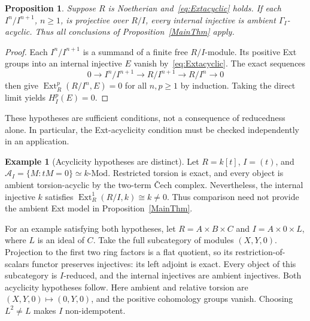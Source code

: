\documentclass[11pt,reqno]{amsart}
\newtheorem{proposition}[theorem]{Proposition}
\theoremstyle{definition}
\newtheorem{example}[theorem]{Example}
\theoremstyle{remark}
\newcommand{\Mod}{\text{-}\mathrm{Mod}}
\newcommand{\Ext}{\operatorname{Ext}}
\newcommand{\A}{\mathcal A_I}
\begin{document}
\begin{proposition}\label{Inj n}
Suppose $R$ is Noetherian and~\eqref{eq:Extacyclic} holds. If each $I^n/I^{n+1}$, $n\geq1$, is projective over $R/I$, every internal injective is ambient $\Gamma_I$-acyclic. Thus all conclusions of Proposition~\ref{MainThm} apply.
\end{proposition}
\begin{proof}
Each $I^n/I^{n+1}$ is a summand of a finite free $R/I$-module. Its positive Ext groups into an internal injective $E$ vanish by~\eqref{eq:Extacyclic}. The exact sequences
\[
0\to I^n/I^{n+1}\to R/I^{n+1}\to R/I^n\to0
\]
then give $\Ext_R^p(R/I^n,E)=0$ for all $n,p\geq1$ by induction. Taking the direct limit yields $H_I^p(E)=0$.
\end{proof}

These hypotheses are sufficient conditions, not a consequence of reducedness alone. In particular, the Ext-acyclicity condition must be checked independently in an application.

\begin{example}[Acyclicity hypotheses are distinct]
Let $R=k[t]$, $I=(t)$, and $\A=\{M:tM=0\}\simeq k\Mod$. Restricted torsion is exact, and every object is ambient torsion-acyclic by the two-term \v{C}ech complex. Nevertheless, the internal injective $k$ satisfies $\Ext_R^1(R/I,k)\cong k\ne0$. Thus comparison need not provide the ambient Ext model in Proposition~\ref{MainThm}.

For an example satisfying both hypotheses, let $R=A\times B\times C$ and $I=A\times0\times L$, where $L$ is an ideal of $C$. Take the full subcategory of modules $(X,Y,0)$. Projection to the first two ring factors is a flat quotient, so its restriction-of-scalars functor preserves injectives: its left adjoint is exact. Every object of this subcategory is $I$-reduced, and the internal injectives are ambient injectives. Both acyclicity hypotheses follow. Here ambient and relative torsion are $(X,Y,0)\mapsto(0,Y,0)$, and the positive cohomology groups vanish. Choosing $L^2\ne L$ makes $I$ non-idempotent.
\end{example}
\end{document}
